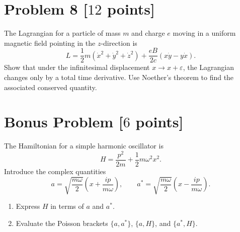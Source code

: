 \documentclass[11pt, a4paper]{article} %
\begin{document}
\newpage

\section*{Problem 8 [$12$ points]}
The Lagrangian for a particle of mass \(m\) and charge \(e\) moving in a uniform magnetic field pointing in the \(z\)-direction is
\[
L = \frac{1}{2}m\left(\dot{x}^2 + \dot{y}^2  + \dot{z}^2 \right)
+ \frac{eB}{2c}\left(x\dot{y} - y\dot{x}\right).
\]
Show that under the infinitesimal displacement \(x\to x+\varepsilon\), the Lagrangian changes only by a total time derivative. Use Noether's theorem to find the associated conserved quantity.

\newpage

\section*{Bonus Problem [$6$ points]}
The Hamiltonian for a simple harmonic oscillator is
\[
H=\frac{p^2}{2m}+\frac{1}{2}m\omega^2 x^2.
\]
Introduce the complex quantities
\[
a=\sqrt{\frac{m\omega}{2}}\left(x+\frac{i p}{m\omega}\right),
\qquad
a^*=\sqrt{\frac{m\omega}{2}}\left(x-\frac{i p}{m\omega}\right).
\]

\begin{enumerate}
    \item[(a)] Express \(H\) in terms of \(a\) and \(a^*\).

    \item[(b)] Evaluate the Poisson brackets \(\{a,a^*\}\), \(\{a,H\}\), and \(\{a^*,H\}\).
\end{enumerate}
\end{document}
